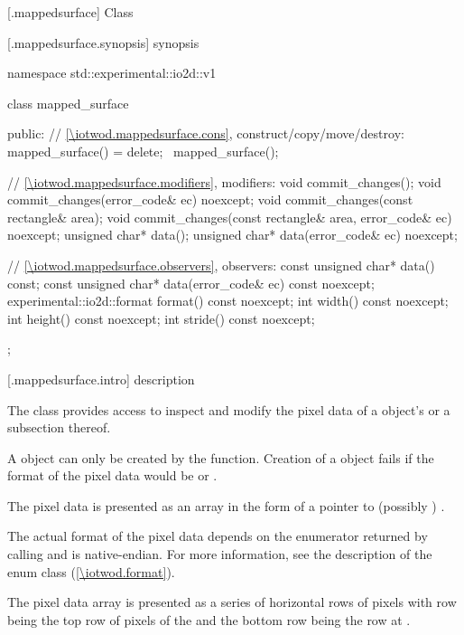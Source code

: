  [\iotwod.mappedsurface] {Class }

 [\iotwod.mappedsurface.synopsis] { synopsis}

\begin{codeblock}
namespace std::experimental::io2d::v1 {
  class mapped_surface {
  public:
    // \ref{\iotwod.mappedsurface.cons}, construct/copy/move/destroy:
    mapped_surface() = delete;
    ~mapped_surface();
    
    // \ref{\iotwod.mappedsurface.modifiers}, modifiers:
    void commit_changes();
    void commit_changes(error_code& ec) noexcept;
    void commit_changes(const rectangle& area);
    void commit_changes(const rectangle& area, error_code& ec) noexcept;
    unsigned char* data();
    unsigned char* data(error_code& ec) noexcept;
    
    // \ref{\iotwod.mappedsurface.observers}, observers:
    const unsigned char* data() const;
    const unsigned char* data(error_code& ec) const noexcept;
    experimental::io2d::format format() const noexcept;
    int width() const noexcept;
    int height() const noexcept;
    int stride() const noexcept;
  };
}
\end{codeblock}

 [\iotwod.mappedsurface.intro] { description}

\pnum
{}
The  class provides access to inspect and modify the pixel data of a  object's \underlyingsurface or a subsection thereof.

\pnum
A  object can only be created by the  function. Creation of a  object fails if the format of the pixel data would be  or .

\pnum
The pixel data is presented as an array in the form of a pointer to (possibly ) .

\pnum
The actual format of the pixel data depends on the  enumerator returned by calling  and is native-endian. For more information, see the description of the  enum class (\ref{\iotwod.format}).

\pnum
The pixel data array is presented as a series of horizontal rows of pixels with row  being the top row of pixels of the \underlyingsurface and the bottom row being the row at .

